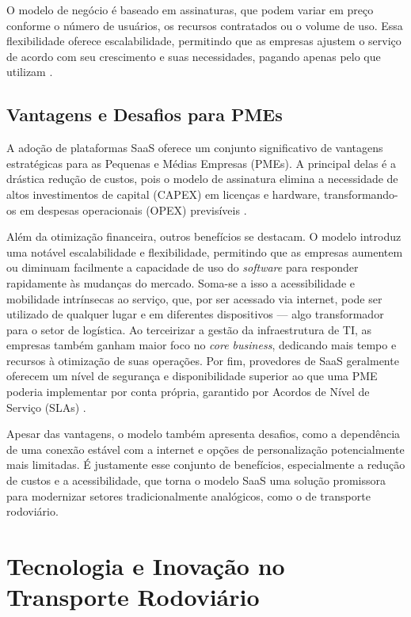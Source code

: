 O modelo de negócio é baseado em assinaturas, que podem variar em preço conforme o número de usuários, os recursos contratados ou o volume de uso. Essa flexibilidade oferece escalabilidade, permitindo que as empresas ajustem o serviço de acordo com seu crescimento e suas necessidades, pagando apenas pelo que utilizam \cite{prologapp2024saas}.

\subsection{Vantagens e Desafios para PMEs}

A adoção de plataformas SaaS oferece um conjunto significativo de vantagens estratégicas para as Pequenas e Médias Empresas (PMEs). A principal delas é a drástica redução de custos, pois o modelo de assinatura elimina a necessidade de altos investimentos de capital (CAPEX) em licenças e hardware, transformando-os em despesas operacionais (OPEX) previsíveis \cite{praxio2021vantagens}.

Além da otimização financeira, outros benefícios se destacam. O modelo introduz uma notável escalabilidade e flexibilidade, permitindo que as empresas aumentem ou diminuam facilmente a capacidade de uso do \textit{software} para responder rapidamente às mudanças do mercado. Soma-se a isso a acessibilidade e mobilidade intrínsecas ao serviço, que, por ser acessado via internet, pode ser utilizado de qualquer lugar e em diferentes dispositivos — algo transformador para o setor de logística. Ao terceirizar a gestão da infraestrutura de TI, as empresas também ganham maior foco no \textit{core business}, dedicando mais tempo e recursos à otimização de suas operações. Por fim, provedores de SaaS geralmente oferecem um nível de segurança e disponibilidade superior ao que uma PME poderia implementar por conta própria, garantido por Acordos de Nível de Serviço (SLAs) \cite{prologapp2024saas, praxio2021vantagens}.

Apesar das vantagens, o modelo também apresenta desafios, como a dependência de uma conexão estável com a internet e opções de personalização potencialmente mais limitadas. É justamente esse conjunto de benefícios, especialmente a redução de custos e a acessibilidade, que torna o modelo SaaS uma solução promissora para modernizar setores tradicionalmente analógicos, como o de transporte rodoviário.

\section{Tecnologia e Inovação no Transporte Rodoviário}


